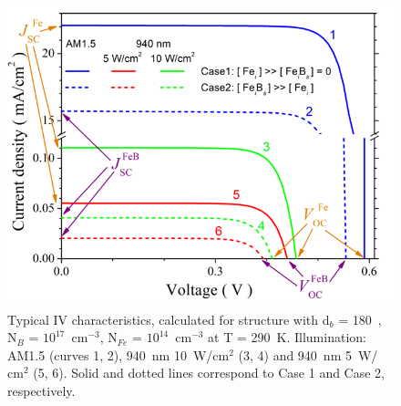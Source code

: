 \documentclass[a4paper,fleqn]{cas-sc}
\begin{document}
\begin{figure}
	\centering
		\includegraphics{Figure2.png}
	  \caption{Typical IV characteristics, calculated for structure with d$_b$ = 180~\textnormal{\textmu}, N$_B$ = $10^{17}$~$\mathrm{cm}^{-3}$, N$_{Fe}$ = $10^{14}$~$\mathrm{cm}^{-3}$ at T = 290~K. Illumination: AM1.5 (curves 1, 2), 940~nm 10~W/$\mathrm{cm}^{2}$ (3, 4) and 940~nm 5~W/$\mathrm{cm}^{2}$ (5, 6). Solid and dotted lines correspond to Case 1 and Case 2, respectively.}\label{fig2}
\end{figure}






\end{document}
